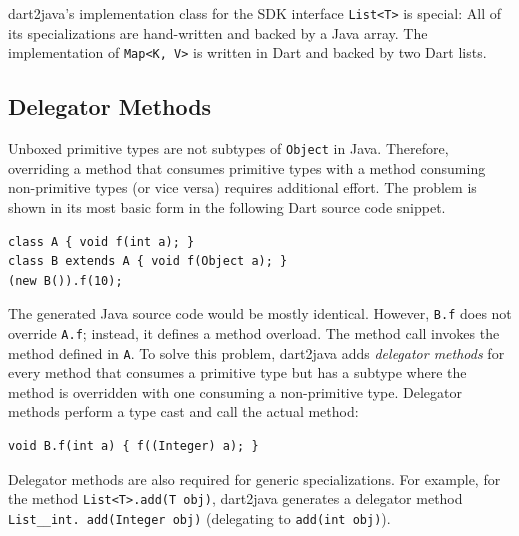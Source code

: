 \documentclass[sigplan]{acmart}
\begin{document}
dart2java's implementation class for the SDK interface \texttt{List<T>} is special: All of its specializations are hand-written and backed by a Java array. The implementation of \texttt{Map<K, V>} is written in Dart and backed by two Dart lists.

\subsection{Delegator Methods}
Unboxed primitive types are not subtypes of \texttt{Object} in Java. Therefore, overriding a method that consumes primitive types with a method consuming non-primitive types (or vice versa) requires additional effort. The problem is shown in its most basic form in the following Dart source code snippet.

\begin{mdframed}[outerlinewidth=0.1pt,outerlinecolor=black,skipabove=4pt,
  innerleftmargin=5pt,innerrightmargin=0pt,innertopmargin=0pt,innerbottommargin=0pt]
\begin{lstlisting}
class A { void f(int a); }
class B extends A { void f(Object a); }
(new B()).f(10);
\end{lstlisting}
\end{mdframed}
The generated Java source code would be mostly identical. However, \texttt{B.f} does not override \texttt{A.f}; instead, it defines a method overload. The method call invokes the method defined in \texttt{A}. To solve this problem, dart2java adds \emph{delegator methods} for every method that consumes a primitive type but has a subtype where the method is overridden with one consuming a non-primitive type. Delegator methods perform a type cast and call the actual method:
\begin{mdframed}[outerlinewidth=0.1pt,outerlinecolor=black,skipabove=4pt,
  innerleftmargin=5pt,innerrightmargin=0pt,innertopmargin=0pt,innerbottommargin=0pt]
\begin{lstlisting}
void B.f(int a) { f((Integer) a); }
\end{lstlisting}
\end{mdframed}
Delegator methods are also required for generic specializations. For example, for the method \texttt{List<T>.add(T obj)}, dart2java generates a delegator method \texttt{List\_\_int. add(Integer obj)} (delegating to \texttt{add(int obj)}).
\end{document}
